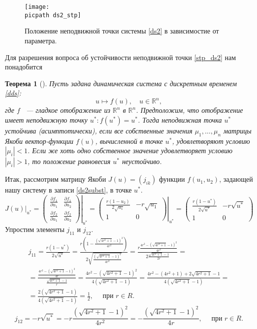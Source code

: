 \documentclass[oneside,final,12pt]{article}
\newcommand*\Rn  [1]{\mathbb{R}^{#1}}
\newcommand*\vat[2]{\left.#1\right|_{#2}}
\newcommand*\abs[1]{|#1|}
\newcommand*\picsize{0.5\textwidth}
\newcommand*\picpath{pictures/}
\theoremstyle{plain}
\newtheorem*{theorem}{Теорема}
\theoremstyle{remark}
\theoremstyle{definition}
\theoremstyle{plain}
\begin{document}
		\begin{figure}[!h]
			\centering
			\texttt{[image: \\picpath ds2\_stp]}
			\caption{Положение неподвижной точки системы \eqref{ds2} в зависимостие от параметра.} 
		\end{figure}

 		Для разрешения вопроса об устойчивости неподвижной точки \eqref{stp_ds2} нам понадобится
		\begin{theorem}[\cite{DSMB}]\label{th1}
			Пусть задана динамическая система с дискретным временем \eqref{dds}:
			\[u \mapsto f(u), \quad u \in \Rn{n},\]
		где \(f\) ~--- гладкое отображение из \(\Rn{n}\) в \(\Rn{n}\). Предположим, что отображение имеет неподвижную точку \(u^* : f(u^*) = u^*\). Тогда неподвижная точка \(u^*\) устойчива (асимптотически), если все собственные значения \(\mu_1,\ldots,\mu_n\) матрицы Якоби вектор-функции \(f(u)\), вычисленной в точке \(u^*\), удовлетворяют условию \(\abs{\mu_i} < 1\). Если же хоть одно собственное значение удовлетворяет условию \(\abs{\mu_i} > 1\), то положение равновесия \(u^*\) неустойчиво.
		\end{theorem}
	
		Итак, рассмотрим матрицу Якоби \(J(u) = (j_{ik})\) функции \(f(u_1,u_2)\), задающей нашу систему в записи \eqref{ds2subst}, в точке \(u^*\).
		\begin{equation*}
			\newcommand*\dfdu[2]{\frac{\partial f_{#1}}{\partial u_{#2}}}
			\vat{J(u)}{u^*} = \vat{\begin{pmatrix} \dfdu{1}{1} & \dfdu{1}{2} \\[5pt] \dfdu{2}{1} & \dfdu{2}{2} \end{pmatrix}}{u^*} = \vat{\begin{pmatrix} \frac{r(1-u_2)}{2\sqrt{u_1}} & -r\sqrt{u_1} \\[5pt] 1 & 0 \end{pmatrix}}{u^*} = \begin{pmatrix} \frac{r(1-u^*)}{2\sqrt{u^*}} & -r\sqrt{u^*} \\[5pt] 1 & 0 \end{pmatrix} 
		\end{equation*}
		Упростим элементы \(j_{11}\) и \(j_{12}\).
		\begin{multline*}
			j_{11} = \frac{r(1-u^*)}{2\sqrt{u^*}} = \frac{r\left(1-\frac{(\sqrt{4r^2+1}-1)^2}{4r^2}\right)}{2\sqrt{\frac{(\sqrt{4r^2+1}-1)^2}{4r^2}}} = \frac{r\frac{4r^2-(\sqrt{4r^2+1}-1)^2}{4r^2}}{2\frac{\sqrt{4r^2+1}-1}{2r}} = \\ = \frac{\frac{4r^2-(\sqrt{4r^2+1}-1)^2}{4r}}{\frac{\sqrt{4r^2+1}-1}{r}} = \frac{4r^2-(\sqrt{4r^2+1}-1)^2}{4(\sqrt{4r^2+1}-1)} = \frac{4r^2-(4r^2+1) + 2\sqrt{4r^2+1} - 1}{4(\sqrt{4r^2+1}-1)} = \\ =  \frac{2(\sqrt{4r^2+1} - 1)}{4(\sqrt{4r^2+1}-1)} = \frac{1}{2}, \quad \text{ при } r \in R.
		\end{multline*}
			\[j_{12} =  -r\sqrt{u^*} = -r\frac{(\sqrt{4r^2+1}-1)^2}{4r^2} = -\frac{(\sqrt{4r^2+1}-1)^2}{4r}, \quad \text{ при } r \in R.\]
\end{document}
